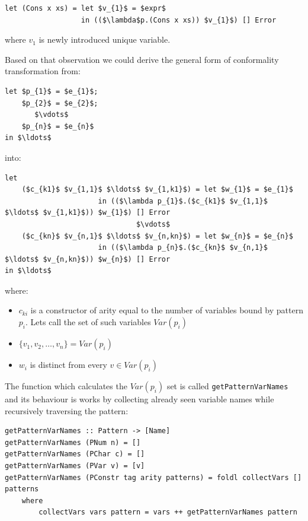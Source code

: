 \documentclass[12pt,a4paper]{report}
\begin{document}
\vspace*{0.2in}
\begin{lstlisting}[style=haskell,mathescape=true]
let (Cons x xs) = let $v_{1}$ = $expr$
                  in (($\lambda$p.(Cons x xs)) $v_{1}$) [] Error
\end{lstlisting}
where $v_{1}$ is newly introduced unique variable.

Based on that observation we could derive the general form of conformality
transformation from:

\vspace*{0.2in}
\begin{lstlisting}[style=haskell,mathescape=true]
let $p_{1}$ = $e_{1}$;
    $p_{2}$ = $e_{2}$;
       $\vdots$
    $p_{n}$ = $e_{n}$
in $\ldots$
\end{lstlisting}
into:

\vspace*{0.2in}
\begin{lstlisting}[style=haskell,mathescape=true]
let
    ($c_{k1}$ $v_{1,1}$ $\ldots$ $v_{1,k1}$) = let $w_{1}$ = $e_{1}$
                      in (($\lambda p_{1}$.($c_{k1}$ $v_{1,1}$ $\ldots$ $v_{1,k1}$)) $w_{1}$) [] Error
                               $\vdots$
    ($c_{kn}$ $v_{n,1}$ $\ldots$ $v_{n,kn}$) = let $w_{n}$ = $e_{n}$
                      in (($\lambda p_{n}$.($c_{kn}$ $v_{n,1}$ $\ldots$ $v_{n,kn}$)) $w_{n}$) [] Error
in $\ldots$
\end{lstlisting}
where:
\begin{itemize}
  \item $c_{ki}$ is a constructor of arity equal to the number of variables
    bound by pattern $p_{i}$. Lets call the set of such variables $Var(p_{i})$
  \item $\{v_1, v_2, \ldots, v_n\} = Var(p_i)$
  \item $w_{i}$ is distinct from every $v \in Var(p_i)$
\end{itemize}
The function which calculates the $Var(p_i)$ set is called
\texttt{getPatternVarNames} and its behaviour is works by collecting already
seen variable names while recursively traversing the pattern:

\vspace*{0.2in}
\begin{lstlisting}[style=haskell]
getPatternVarNames :: Pattern -> [Name]
getPatternVarNames (PNum n) = []
getPatternVarNames (PChar c) = []
getPatternVarNames (PVar v) = [v]
getPatternVarNames (PConstr tag arity patterns) = foldl collectVars [] patterns
    where
        collectVars vars pattern = vars ++ getPatternVarNames pattern
\end{lstlisting}
\end{document}
